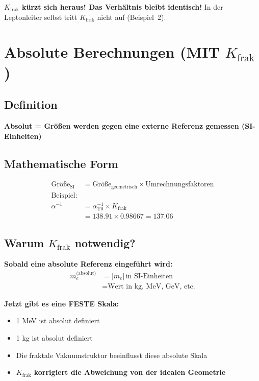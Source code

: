 	\textbf{$K_{\text{frak}}$ kürzt sich heraus! Das Verhältnis bleibt identisch!} In der Leptonleiter selbst tritt $K_{\text{frak}}$ nicht auf (Beispiel~2).
	
	\section{Absolute Berechnungen (MIT $K_{\text{frak}}$)}
	
	\subsection{Definition}
	
	\textbf{Absolut = Größen werden gegen eine externe Referenz gemessen (SI-Einheiten)}
	
	\subsection{Mathematische Form}
	\begin{align*}
		\text{Größe}_{\text{SI}} &= \text{Größe}_{\text{geometrisch}} \times \text{Umrechnungsfaktoren} \\
		\text{Beispiel:} & \\
		\alpha^{-1} &= \alpha_{\text{T0}}^{-1} \times K_{\text{frak}} \\
		&= 138.91 \times 0.98667 = 137.06
	\end{align*}
	
	\subsection{Warum $K_{\text{frak}}$ notwendig?}
	
	\textbf{Sobald eine absolute Referenz eingeführt wird:}
	\begin{align*}
		m_e^{\text{(absolut)}} &= |m_e|\,\text{in SI-Einheiten} \\
		&= \text{Wert in kg, MeV, GeV, etc.}
	\end{align*}
	
	\textbf{Jetzt gibt es eine FESTE Skala:}
	\begin{itemize}
		\item 1 MeV ist absolut definiert
		\item 1 kg ist absolut definiert  
		\item Die fraktale Vakuumstruktur beeinflusst diese absolute Skala
		\item \textbf{$K_{\text{frak}}$ korrigiert die Abweichung von der idealen Geometrie}
	\end{itemize}
	
